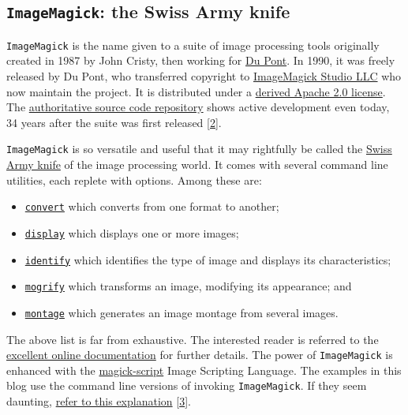 \documentclass[
  a4paper,
]{article}
\providecommand{\tightlist}{%
  \setlength{\itemsep}{0pt}\setlength{\parskip}{0pt}}
\begin{document}
\hypertarget{imagemagick-the-swiss-army-knife}{%
\subsection{\texorpdfstring{\texttt{ImageMagick}: the Swiss Army
knife}{ImageMagick: the Swiss Army knife}}\label{imagemagick-the-swiss-army-knife}}

\texttt{ImageMagick} is the name given to a suite of image processing
tools originally created in 1987 by John Cristy, then working for
\href{https://www.dupont.com/}{Du Pont}. In 1990, it was freely released
by Du Pont, who transferred copyright to
\href{https://imagemagick.org/script/contact.php}{ImageMagick Studio
LLC} who now maintain the project. It is distributed under a
\href{https://imagemagick.org/script/license.php}{derived Apache 2.0
license}. The
\href{https://github.com/ImageMagick/ImageMagick}{authoritative source
code repository} shows active development even today, 34 years after the
suite was first released
{[}\protect\hyperlink{ref-imagemagicksource}{2}{]}.

\texttt{ImageMagick} is so versatile and useful that it may rightfully
be called the
\href{https://www.thefreedictionary.com/Swiss-army+knife}{Swiss Army
knife} of the image processing world. It comes with several command line
utilities, each replete with options. Among these are:

\begin{itemize}
\tightlist
\item
  \href{https://imagemagick.org/script/convert.php}{\texttt{convert}}
  which converts from one format to another;
\item
  \href{https://imagemagick.org/script/display.php}{\texttt{display}}
  which displays one or more images;
\item
  \href{https://imagemagick.org/script/identify.php}{\texttt{identify}}
  which identifies the type of image and displays its characteristics;
\item
  \href{https://imagemagick.org/script/mogrify.php}{\texttt{mogrify}}
  which transforms an image, modifying its appearance; and
\item
  \href{https://imagemagick.org/script/montage.php}{\texttt{montage}}
  which generates an image montage from several images.
\end{itemize}

The above list is far from exhaustive. The interested reader is referred
to the
\href{https://imagemagick.org/script/command-line-tools.php}{excellent
online documentation} for further details. The power of
\texttt{ImageMagick} is enhanced with the
\href{https://imagemagick.org/script/magick-script.php}{magick-script}
Image Scripting Language. The examples in this blog use the command line
versions of invoking \texttt{ImageMagick}. If they seem daunting,
\href{https://imagemagick.org/script/command-line-processing.php}{refer
to this explanation} {[}\protect\hyperlink{ref-imcli}{3}{]}.
\end{document}
